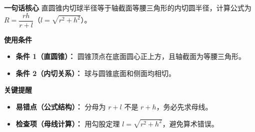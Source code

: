 \begin{summarybox}
	\textbf{\textcolor{CSummary}{一句话核心}}
	直圆锥内切球半径等于轴截面等腰三角形的内切圆半径，计算公式为 $R = \dfrac{rh}{r+l}$（$l = \sqrt{r^2+h^2}$）。

	\medskip
	\textbf{\textcolor{CSummary}{使用条件}}
	\begin{itemize}[leftmargin=*, itemsep=0.5em, topsep=0.4em]
		\item \textbf{条件 1（直圆锥）：} 圆锥顶点在底面圆心正上方，且轴截面为等腰三角形。
		\item \textbf{条件 2（内切关系）：} 球与圆锥底面和侧面均相切。
	\end{itemize}

	\medskip
	\textbf{\textcolor{CSummary}{关键提醒}}
	\begin{itemize}[leftmargin=*, itemsep=0.5em, topsep=0.4em]
		\item \textbf{易错点（公式结构）：} 分母为 $r+l$ 不是 $r+h$，务必先求母线。
		\item \textbf{检查项（母线计算）：} 用勾股定理 $l = \sqrt{r^2+h^2}$，避免算术错误。
	\end{itemize}

\end{summarybox}
